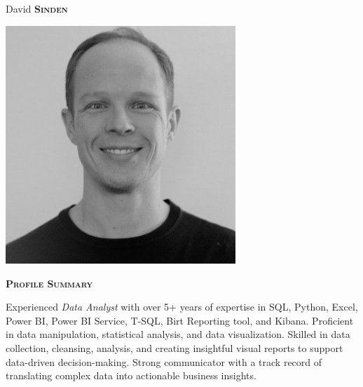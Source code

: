\documentclass[11pt, a4paper]{article}
\newcommand{\headleft}[1]{\vspace*{3ex}\textsc{\textbf{#1}}\par%
    \vspace*{-1.5ex}\hrulefill\par\vspace*{0.7ex}}
\begin{document}
\setlength{\topskip}{0pt}
\setlength{\parindent}{0pt}
\setlength{\parskip}{0pt}
\setlength{\fboxsep}{0pt}
\pagestyle{empty}
\raggedbottom

\begin{minipage}[t]{0.33\textwidth} %
\colorbox{cvblue}{\begin{minipage}[t][5mm][t]{\textwidth}\null\hfill\null\end{minipage}}

\vspace{-.2ex} %
\colorbox{cvblue!90}{\color{white}  %
\textwidth\relax%
\begin{minipage}[t][293mm][t]{0.82\textwidth}
\raggedright
\vspace*{2.5ex}

\Large David \textbf{\textsc{Sinden}} \normalsize 

\null\hfill\includegraphics[width=0.65\textwidth]{../profile.png}\hfill\null

\vspace*{0.5ex} %

\headleft{Profile Summary}
Experienced \textit{Data Analyst} with over 5+ years of expertise in SQL, Python, Excel, Power BI, Power BI Service, T-SQL, Birt Reporting tool, and Kibana. Proficient in data manipulation, statistical analysis, and data visualization. Skilled in data collection, cleansing, analysis, and creating insightful visual reports to support data-driven decision-making. Strong communicator with a track record of translating complex data into actionable business insights.


\end{minipage}}
\end{minipage}
\end{document}
